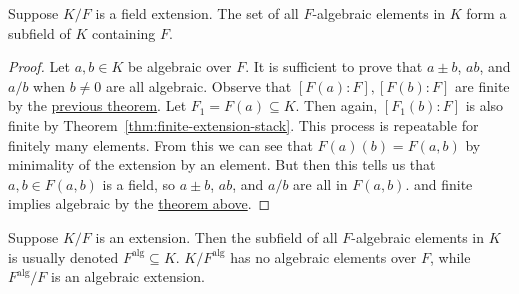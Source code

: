 \begin{theorem}
    Suppose \(K/F\) is a field extension.
    The set of all \(F\)-algebraic elements in \(K\)
    form a subfield of \(K\) containing \(F\).
\end{theorem}
\begin{proof}
    Let \(a,b \in K\) be algebraic over \(F\).
    It is sufficient to prove that \(a \pm b\), \(ab\),
    and \(a/b\) when \(b \neq 0\) are all algebraic.
    Observe that \([F(a):F],[F(b):F]\) are finite by the
    \hyperref[thm:algebraic-finite-extension]{previous theorem}.
    Let \(F_1 = F(a) \subseteq K\).
    Then again, \([F_1(b):F]\) is also finite by Theorem~\ref{thm:finite-extension-stack}.
    This process is repeatable for finitely many elements.
    From this we can see that \(F(a)(b) = F(a,b)\)
    by minimality of the extension by an element.
    But then this tells us that \(a,b \in F(a,b)\) is a field,
    so \(a \pm b\), \(ab\), and \(a/b\) are all in \(F(a,b)\).
    and finite implies algebraic
    by the \hyperref[thm:algebraic-finite-extension]{theorem above}.
\end{proof}
\begin{definition}
    Suppose \(K/F\) is an extension.
    Then the subfield of all \(F\)-algebraic elements in \(K\)
    is usually denoted \(F^\text{alg} \subseteq K\).
    \(K/F^\text{alg}\) has no algebraic elements over \(F\),
    while \(F^\text{alg}/F\) is an algebraic extension.
\end{definition}

